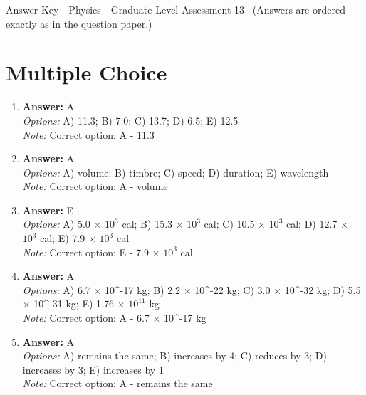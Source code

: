 \documentclass[12pt]{article}
\begin{document}
\begin{center}
Answer Key - Physics - Graduate Level Assessment 13 \
\small (Answers are ordered exactly as in the question paper.)
\end{center}

\section*{Multiple Choice}
\begin{enumerate}[label=\arabic*.]
\item \textbf{Answer:} A
\\ \textit{Options:} A) 11.3; B) 7.0; C) 13.7; D) 6.5; E) 12.5
\\ \textit{Note:} Correct option: A - 11.3
\item \textbf{Answer:} A
\\ \textit{Options:} A) volume; B) timbre; C) speed; D) duration; E) wavelength
\\ \textit{Note:} Correct option: A - volume
\item \textbf{Answer:} E
\\ \textit{Options:} A) 5.0 \ensuremath{\times} $10^3$ cal; B) 15.3 \ensuremath{\times} $10^3$ cal; C) 10.5 \ensuremath{\times} $10^3$ cal; D) 12.7 \ensuremath{\times} $10^3$ cal; E) 7.9 \ensuremath{\times} $10^3$ cal
\\ \textit{Note:} Correct option: E - 7.9 \ensuremath{\times} $10^3$ cal
\item \textbf{Answer:} A
\\ \textit{Options:} A) 6.7 \ensuremath{\times} 10^-17 kg; B) 2.2 \ensuremath{\times} 10^-22 kg; C) 3.0 \ensuremath{\times} 10^-32 kg; D) 5.5 \ensuremath{\times} 10^-31 kg; E) 1.76 \ensuremath{\times} $10^11$ kg
\\ \textit{Note:} Correct option: A - 6.7 \ensuremath{\times} 10^-17 kg
\item \textbf{Answer:} A
\\ \textit{Options:} A) remains the same; B) increases by 4; C) reduces by 3; D) increases by 3; E) increases by 1
\\ \textit{Note:} Correct option: A - remains the same
\end{enumerate}
\end{document}
